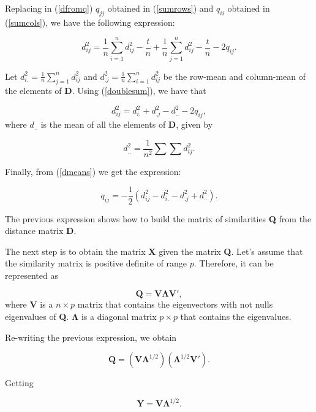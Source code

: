 \documentclass[11pt]{report}
\begin{document}
\indent Replacing in (\ref{dfromq}) $q_{jj}$ obtained in (\ref{sumrows}) and $q_{ii}$
obtained in (\ref{sumcols}), we have the following expression:

\begin{equation} \label{generaldij}
d_{ij}^2 = \frac{1}{n}\sum_{i = 1}^n d_{ij}^2 - \frac{t}{n} + \frac{1}{n} \sum_{j = 1}^n d_{ij}^2 -\frac{t}{n} -2q_{ij}.
\end{equation}

\indent Let $d_{i.}^2 = \frac{1}{n}\sum_{j = 1}^n d_{ij}^2$ and $d_{.j}^2 = \frac{1}{n}\sum_{i=1}^n d_{ij}^2$ 
be the row-mean and column-mean of the elements of \textbf{D}. Using 
(\ref{doublesum}), we have that

\begin{equation} \label{dmeans}
d_{ij}^2 = d_{i.}^2 + d_{.j}^2 - d_{..}^2-2q_{ij},
\end{equation}
where $d_{..}$ is the mean of all the elements of \textbf{D}, given by

\[
d_{..}^2 = \frac{1}{n^2}\sum \sum d_{ij}^2.
\]

\indent Finally, from (\ref{dmeans}) we get the expression:

\begin{equation} \label{qij2}
q_{ij} = -\frac{1}{2}(d_{ij}^2 - d_{i.}^2 - d_{.j}^2 + d_{..}^2).
\end{equation}

\indent The previous expression shows how to build the matrix of similarities 
\textbf{Q} from the distance matrix \textbf{D}.

\indent The next step is to obtain the matrix \textbf{X} given the matrix 
\textbf{Q}. Let's assume that the similarity matrix is positive definite of 
range $p$. Therefore, it can be represented as

\[
\mathbf{Q} = \mathbf{V}\mathbf{\Lambda}\mathbf{V'},
\]
where $\mathbf{V}$ is a $n \times p$ matrix that contains the eigenvectors with
not nulls eigenvalues of \textbf{Q}. $\mathbf{\Lambda}$ is a diagonal matrix 
$p \times p$ that contains the eigenvalues.

\indent Re-writing the previous expression, we obtain

\begin{equation} \label{generalQ}
\mathbf{Q} = (\mathbf{V}\mathbf{\Lambda}^{1/2})(\mathbf{\Lambda}^{1/2}\mathbf{V'}).
\end{equation}

Getting

\[
\mathbf{Y} = \mathbf{V}\mathbf{\Lambda}^{1/2}.
\]
\end{document}
